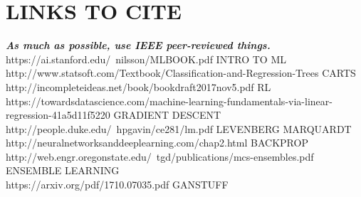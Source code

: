 \documentclass[11pt]{report}
\begin{document}
	\section{LINKS TO CITE}
	\textbf{\textit{As much as possible, use IEEE peer-reviewed things.}}
	https://ai.stanford.edu/~nilsson/MLBOOK.pdf INTRO TO ML \\
	http://www.statsoft.com/Textbook/Classification-and-Regression-Trees CARTS\\
	http://incompleteideas.net/book/bookdraft2017nov5.pdf  RL\\
	https://towardsdatascience.com/machine-learning-fundamentals-via-linear-regression-41a5d11f5220 GRADIENT DESCENT \\
	http://people.duke.edu/~hpgavin/ce281/lm.pdf LEVENBERG MARQUARDT \\
	http://neuralnetworksanddeeplearning.com/chap2.html BACKPROP \\
	http://web.engr.oregonstate.edu/~tgd/publications/mcs-ensembles.pdf ENSEMBLE LEARNING\\
	https://arxiv.org/pdf/1710.07035.pdf GANSTUFF \\
\end{document}
